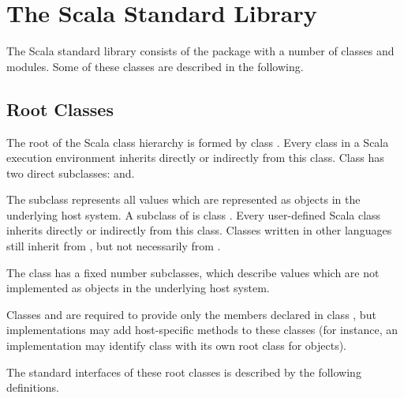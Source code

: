 \documentclass[a4paper,12pt,twoside,titlepage]{book}
\begin{document}
\chapter{The Scala Standard Library}

The Scala standard library consists of the package  with a
number of classes and modules. Some of these classes are described in
the following.

\section{Root Classes}
\label{sec:cls-root}
\label{sec:cls-any}
\label{sec:cls-object}

The root of the Scala class hierarchy is formed by class .
Every class in a Scala execution environment inherits directly or
indirectly from this class.  Class  has two direct
subclasses:  and.

The subclass  represents all values which are represented
as objects in the underlying host system. A subclass of 
is class . Every user-defined Scala class inherits
directly or indirectly from this class. Classes written in other
languages still inherit from , but not necessarily
from . 

The class  has a fixed number subclasses, which describe
values which are not implemented as objects in the underlying host
system.

Classes  and  are required to provide only
the members declared in class , but implementations may add
host-specific methods to these classes (for instance, an
implementation may identify class  with its own root
class for objects).

The standard interfaces of these root classes is described by the
following definitions.
\end{document}
